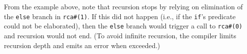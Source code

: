 From the example above, note that recursion stops by relying on elimination of the \verb|else| branch in \verb|rca#(1)|.
If this did not happen (i.e., if the \verb|if|'s predicate could not be elaborated),
then the \verb|else| branch would trigger a call to \verb|rca#(0)| and recursion would not end.
(To avoid infinite recursion, the compiler limits recursion depth and emits an error when exceeded.)

